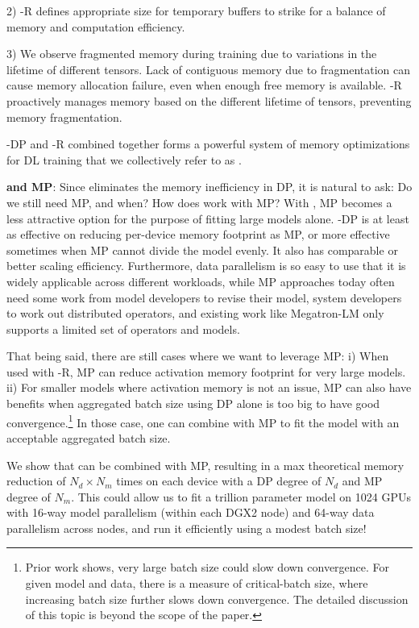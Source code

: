 2) \name-R defines appropriate size for temporary buffers to strike for a balance of memory and computation efficiency. 

3) We observe fragmented memory during training due to variations in the lifetime of different tensors. Lack of contiguous memory due to fragmentation can cause memory allocation failure, even when enough free memory is available. \name-R proactively manages memory based on the different lifetime of tensors, preventing memory fragmentation.

\name-DP and \name-R combined together forms a powerful system of memory optimizations for DL training that we collectively refer to as \name.

\textbf{\name and MP}: Since \name eliminates the memory inefficiency in DP, it is natural to ask: Do we still need MP, and when?  How does \name work with MP?  With \name, MP becomes a less attractive option for the purpose of fitting large models alone.  \name-DP is at least as effective on reducing per-device memory footprint as MP, or more effective sometimes when MP cannot divide the model evenly. It also has comparable or better scaling efficiency. Furthermore, data parallelism is so easy to use that it is widely applicable across different workloads, while MP approaches today often need some work from model developers to revise their model, system developers to work out distributed operators, and existing work like Megatron-LM only supports a limited set of operators and models.

That being said, there are still cases where we want to leverage MP: i) When used with \name-R, MP can reduce activation memory footprint for very large models. ii) For smaller models where activation memory is not an issue, MP can also have benefits when aggregated batch size using DP alone is too big to have good convergence.\footnote{Prior work \cite{DBLP:journals/corr/batch-scaling} shows, very large batch size could slow down convergence.  For given model and data, there is a measure of critical-batch size, where increasing batch size further slows down convergence.  The detailed discussion of this topic is beyond the scope of the paper.}  In those case, one can combine \name with MP to fit the model with an acceptable aggregated batch size.

We show that \name can be combined with MP, resulting in a max theoretical memory reduction of $N_d \times N_m$ times on each device with a DP degree of $N_d$ and MP degree of $N_m$. 
This could allow us to fit a trillion parameter model on 1024 GPUs with 16-way model parallelism (within each DGX2 node) and 64-way data parallelism across nodes, and run it efficiently using a modest batch size!


